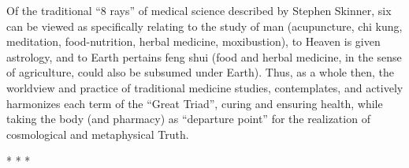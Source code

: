 Of the traditional ``8 rays'' of medical science described by Stephen Skinner, six can be viewed as specifically relating to the study of man (acupuncture, chi kung, meditation, food-nutrition, herbal medicine, moxibustion), to Heaven is given astrology, and to Earth pertains feng shui (food and herbal medicine, in the sense of agriculture, could also be subsumed under Earth). Thus, as a whole then, the worldview and practice of traditional medicine studies, contemplates, and actively harmonizes each term of the ``Great Triad'', curing and ensuring health, while taking the body (and pharmacy) as ``departure point'' for the realization of cosmological and metaphysical Truth.



\begin{center}* * *\end{center}

